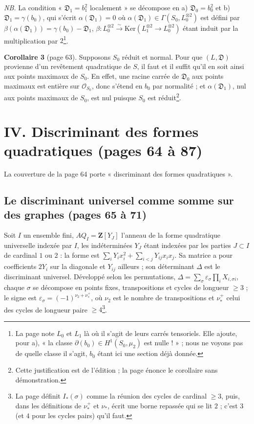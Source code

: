 \documentclass[11pt,a4paper]{article}
\begin{document}
\emph{NB.} La condition « $\mathfrak{D}_1 = b_1^2$ localement » se décompose en a)
$\mathfrak{D}_0 = b_0^2$ et b) $\mathfrak{D}_1 = \gamma(b_0)$, qui s'écrit $\alpha(\mathfrak{D}_1)
= 0$ où $\alpha(\mathfrak{D}_1) \in \Gamma(S_0, L_0^{\otimes 2})$ est défini par
$\beta(\alpha(\mathfrak{D}_1)) = \gamma(b_0) - \mathfrak{D}_1$, $\beta : L_0^{\otimes 2}
\xrightarrow{\sim} \mathrm{Ker}(L_1^{\otimes 2} \to L_0^{\otimes 2})$ étant induit par la
multiplication par $2$\footnote{La page note $L_0$ et $L_1$ là où il s'agit de leurs
carrés tensoriels. Elle ajoute, pour a), « la classe $\partial(b_0) \in H^1(S_0,
\mu_2)$ est nulle ! » ; nous ne voyons pas de quelle classe il s'agit, $b_0$ étant ici
une section déjà donnée.}.

\textbf{Corollaire 3} (page 63). Supposons $S_0$ réduit et normal. Pour que $(L,
\mathfrak{D})$ provienne d'un revêtement quadratique de $S$, il faut et il suffit qu'il en
soit ainsi aux points maximaux de $S_0$. En effet, une racine carrée de $\mathfrak{D}_0$
aux points maximaux est entière sur $\mathcal{O}_{S_0}$, donc s'étend en $b_0$ par
normalité ; et $\alpha(\mathfrak{D}_1)$, nul aux points maximaux de $S_0$, est nul
puisque $S_0$ est réduit\footnote{Cette justification est de l'édition ; la page
énonce le corollaire sans démonstration.}.

\section*{IV. Discriminant des formes quadratiques (pages 64 à 87)}

La couverture de la page 64 porte « discriminant des formes quadratiques ».

\subsection*{Le discriminant universel comme somme sur des graphes (pages 65 à 71)}

Soit $I$ un ensemble fini, $AQ_I = \mathbf{Z}[Y_J]$ l'anneau de la forme
quadratique universelle indexée par $I$, les indéterminées $Y_J$ étant indexées par
les parties $J \subset I$ de cardinal $1$ ou $2$ : la forme est $\sum_i Y_i x_i^2 +
\sum_{i < j} Y_{ij} x_i x_j$. Sa matrice a pour coefficients $2Y_i$ sur la diagonale
et $Y_{ij}$ ailleurs ; son déterminant $\Delta$ est le discriminant universel.
Développé selon les permutations, $\Delta = \sum_\sigma \varepsilon_\sigma \prod_i
X_{i, \sigma i}$, chaque $\sigma$ se décompose en points fixes, transpositions et
cycles de longueur $\geq 3$ ; le signe est $\varepsilon_\sigma = (-1)^{\nu_2 +
\nu_*^+}$, où $\nu_2$ est le nombre de transpositions et $\nu_*^+$ celui des cycles de
longueur paire $\geq 4$\footnote{La page définit $I_*(\sigma)$ comme la réunion des
cycles de cardinal $\geq 3$, puis, dans les définitions de $\nu_*^+$ et $\nu_*$, écrit
une borne repassée qui se lit $2$ ; c'est $3$ (et $4$ pour les cycles pairs) qu'il
faut.}.
\end{document}
